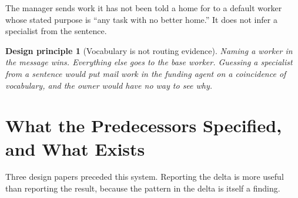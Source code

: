 \documentclass[11pt]{article}
\newtheorem{principle}{Design principle}
\begin{document}
The manager sends work it has not been told a home for to a default worker whose stated purpose is ``any task with no better home.'' It does not infer a specialist from the sentence.

\begin{principle}[Vocabulary is not routing evidence]
\label{prin:routing}
Naming a worker in the message wins. Everything else goes to the base worker. Guessing a specialist from a sentence would put mail work in the funding agent on a coincidence of vocabulary, and the owner would have no way to see why.
\end{principle}

\section{What the Predecessors Specified, and What Exists}
\label{sec:vsdesign}

Three design papers preceded this system. Reporting the delta is more useful than reporting the result, because the pattern in the delta is itself a finding.
\end{document}
